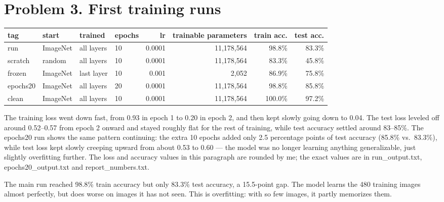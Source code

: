 \documentclass[11pt]{article}
\begin{document}
\section*{Problem 3. First training runs}

\begin{center}\footnotesize
\begin{tabular}{llllrrrr}
\toprule
tag & start & trained & epochs & lr & trainable parameters & train acc. & test acc. \\
\midrule
run & ImageNet & all layers & 10 & 0.0001 & 11,178,564 & 98.8\% & 83.3\% \\
scratch & random & all layers & 10 & 0.0001 & 11,178,564 & 83.3\% & 45.8\% \\
frozen & ImageNet & last layer & 10 & 0.001 & 2,052 & 86.9\% & 75.8\% \\
epochs20 & ImageNet & all layers & 20 & 0.0001 & 11,178,564 & 98.8\% & 85.8\% \\
clean & ImageNet & all layers & 10 & 0.0001 & 11,178,564 & 100.0\% & 97.2\% \\
\bottomrule
\end{tabular}
\end{center}


The training loss went down fast, from 0.93 in epoch 1 to 0.20 in epoch 2, and then kept slowly going down to 0.04. The test loss leveled off around 0.52--0.57 from epoch 2 onward and stayed roughly flat for the rest of training, while test accuracy settled around 83--85\%. The epochs20 run shows the same pattern continuing: the extra 10 epochs added only 2.5 percentage points of test accuracy (85.8\% vs.\ 83.3\%), while test loss kept slowly creeping upward from about 0.53 to 0.60 --- the model was no longer learning anything generalizable, just slightly overfitting further. The loss and accuracy values in this paragraph are rounded by me; the exact values are in run\_output.txt, epochs20\_output.txt and report\_numbers.txt.

The main run reached 98.8\% train accuracy but only 83.3\% test accuracy, a 15.5-point gap. The model learns the 480 training images almost perfectly, but does worse on images it has not seen. This is overfitting: with so few images, it partly memorizes them.

\begin{center}\end{center}
\end{document}
